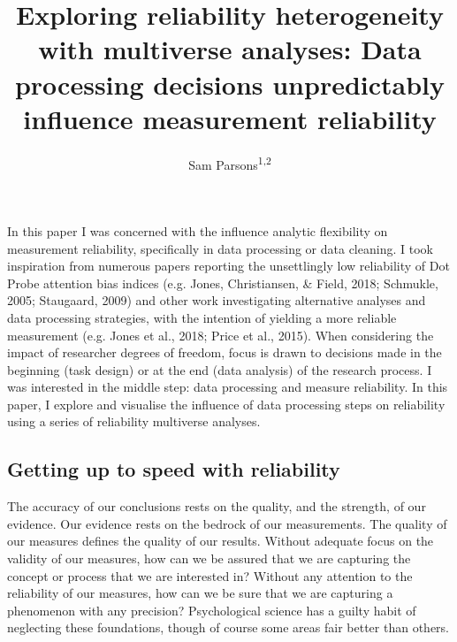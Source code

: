\documentclass[
  man,floatsintext]{apa6}
\title{Exploring reliability heterogeneity with multiverse analyses: Data processing decisions unpredictably influence measurement reliability}
\author{Sam Parsons\textsuperscript{1,2}}
\date{}
\affiliation{\vspace{0.5cm}\textsuperscript{1} University of Oxford\\\textsuperscript{2} Radboud University Medical Center}
\begin{document}
\maketitle

In this paper I was concerned with the influence analytic flexibility on measurement reliability, specifically in data processing or data cleaning. I took inspiration from numerous papers reporting the unsettlingly low reliability of Dot Probe attention bias indices (e.g. Jones, Christiansen, \& Field, 2018; Schmukle, 2005; Staugaard, 2009) and other work investigating alternative analyses and data processing strategies, with the intention of yielding a more reliable measurement (e.g. Jones et al., 2018; Price et al., 2015). When considering the impact of researcher degrees of freedom, focus is drawn to decisions made in the beginning (task design) or at the end (data analysis) of the research process. I was interested in the middle step: data processing and measure reliability. In this paper, I explore and visualise the influence of data processing steps on reliability using a series of reliability multiverse analyses.

\hypertarget{getting-up-to-speed-with-reliability}{%
\subsection{Getting up to speed with reliability}\label{getting-up-to-speed-with-reliability}}

The accuracy of our conclusions rests on the quality, and the strength, of our evidence. Our evidence rests on the bedrock of our measurements. The quality of our measures defines the quality of our results. Without adequate focus on the validity of our measures, how can we be assured that we are capturing the concept or process that we are interested in? Without any attention to the reliability of our measures, how can we be sure that we are capturing a phenomenon with any precision? Psychological science has a guilty habit of neglecting these foundations, though of course some areas fair better than others.
\end{document}
